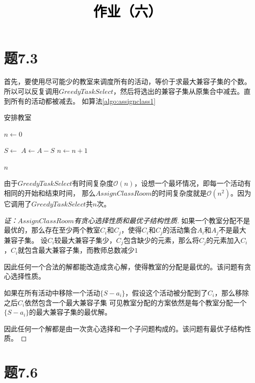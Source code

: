 \documentclass[a4paper,twoside]{article}
\newcommand{\PaperTitle}{作业（六）}  %
\begin{document}
\newpage

\title{
	\Large{\textcolor{black}{\PaperTitle}}
}
	
	
\maketitle
	
\tableofcontents
 
\newpage
\setcounter{page}{1}

\begin{spacing}{1.2}

\section{题7.3}

首先，要使用尽可能少的教室来调度所有的活动，等价于求最大兼容子集的个数。
所以可以反复调用$GreedyTaskSelect$，然后将选出的兼容子集从原集合中减去。直到所有的活动都被减去。
如算法\ref{algo:assignclass1}

\begin{algorithm}
	\caption{安排教室}
	\label{algo:assignclass1}
	\begin{algorithmic}[1]
		
		
		\State $n\gets 0$

		\State $S \gets$ 
		\State $A\gets A-S$
		\State $n\gets n+1$
		\EndWhile

		\State \Return $n$
		
		\EndProcedure
	\end{algorithmic}
\end{algorithm}	

由于$GreedyTaskSelect$有时间复杂度$\mathcal{O}(n)$，设想一个最坏情况，即每一个活动有相同的开始和结束时间，
那么$AssignClassRoom$的时间复杂度就是$\mathcal{O}(n^2)$。因为它调用了$GreedyTaskSelect$共$n$次。

\begin{proof}[证：$AssignClassRoom$有贪心选择性质和最优子结构性质]
	
如果一个教室分配不是最优的，那么存在至少两个教室$C_i$和$C_j$，使得$C_i$和$C_j$的活动集合$A_i$和$A_j$不是最大兼容子集。
设$C_i$较最大兼容子集少，$C_j$包含缺少的元素，那么将$C_j$的元素加入$C_i$，$C_i$就包含最大兼容子集，而教师总数减少$1$

因此任何一个合法的解都能改造成贪心解，使得教室的分配是最优的。该问题有贪心选择性质。

如果在所有活动中移除一个活动$\{S-a_i\}$，假设这个活动被分配到了$C_i$，那么移除之后$C_i$依然包含一个最大兼容子集
可见教室分配的方案依然是每个教室分配一个$\{S-a_i\}$的最大兼容子集的最优解。

因此任何一个解都是由一次贪心选择和一个子问题构成的。该问题有最优子结构性质。

\end{proof}

\section{题7.6}



\end{spacing}
\end{document}
